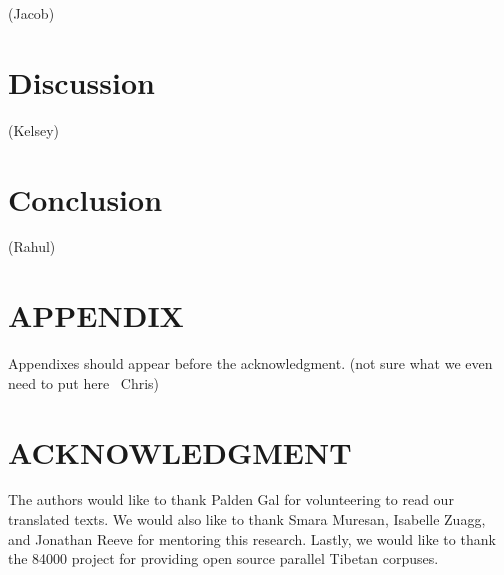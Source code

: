\documentclass[letterpaper, 10 pt, conference]{ieeeconf}  %
\begin{document}
(Jacob)

\section{Discussion}


(Kelsey)



\section{Conclusion}


(Rahul)


\section*{APPENDIX}

Appendixes should appear before the acknowledgment. (not sure what we even need to put here ~Chris)

\section*{ACKNOWLEDGMENT}

The authors would like to thank Palden Gal for volunteering to read our translated texts. We would also like to thank Smara Muresan, Isabelle Zuagg, and Jonathan Reeve for mentoring this research. Lastly, we would like to thank the 84000 project for providing open source parallel Tibetan corpuses. 
\end{document}
